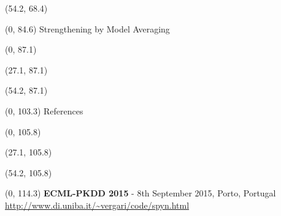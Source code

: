 \documentclass[final]{beamer}
\begin{document}
\begin{frame}{}
  \begin{textblock}{25.7}(54.2, 68.4)
    \small
    \blindtext
  \end{textblock}
  
  
  
  \begin{textblock}{80}(0, 84.6)
    Strengthening by Model Averaging
  \end{textblock}
  
  \begin{textblock}{25.7}(0, 87.1)
    \small
    \blindtext
  \end{textblock}
  
  \begin{textblock}{25.7}(27.1, 87.1)
    \small
    \blindtext
  \end{textblock}
  
  \begin{textblock}{25.7}(54.2, 87.1)
    \small
    \blindtext
  \end{textblock}
  
  
  
  \begin{textblock}{80}(0, 103.3)
    References
  \end{textblock}
  
  \begin{textblock}{25.7}(0, 105.8)
    \small
  \end{textblock}
  
  \begin{textblock}{25.7}(27.1, 105.8)
    \small
  \end{textblock}
  
  \begin{textblock}{25.7}(54.2, 105.8)
    \small
  \end{textblock}

  \begin{textblock}{80}(0, 114.3)
    \textbf{ECML-PKDD 2015} - 8th September 2015, Porto, Portugal\hfill
    {\url{http://www.di.uniba.it/~vergari/code/spyn.html}}
  \end{textblock}
  
\end{frame}
\end{document}
